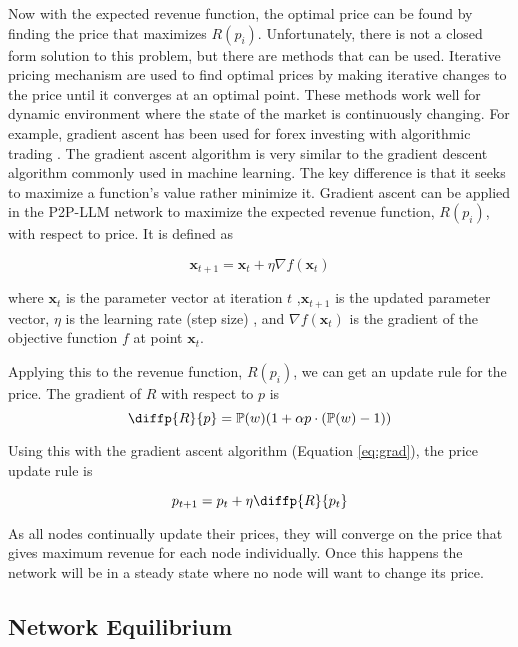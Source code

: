 \documentclass[preprint,twoside,11pt]{article}
\begin{document}
Now with the expected revenue function, the optimal price can be found by finding the price that maximizes $R(p_i)$.
Unfortunately, there is not a closed form solution to this problem, but there are methods that can be used.
Iterative pricing mechanism \citep{ecf80b8b-07bb-374f-ab3f-2cc6a349f689} are used to find optimal prices by making iterative changes to the price until it converges at an optimal point.
These methods work well for dynamic environment where the state of the market is continuously changing.
For example, gradient ascent has been used for forex investing with algorithmic trading \citep{su142215328}.
The gradient ascent algorithm is very similar to the gradient descent algorithm \citep{cauchy1847methode} commonly used in machine learning.
The key difference is that it seeks to maximize a function's value rather minimize it.
Gradient ascent can be applied in the P2P-LLM network to maximize the expected revenue function, $R(p_i)$, with respect to price.
It is defined as

\begin{equation}
	\mathbf{x}_{t+1} = \mathbf{x}_t + \eta \nabla f(\mathbf{x}_t)
	\label{eq:grad}
\end{equation}

where $\mathbf{x}_t$ is the parameter vector at iteration $t$
,$\mathbf{x}_{t+1}$ is the updated parameter vector,
$\eta$ is the learning rate (step size)
, and $\nabla f(\mathbf{x}_t)$ is the gradient of the objective function $f$ at point $\mathbf{x}_t$.

Applying this to the revenue function, $R(p_i)$, we can get an update rule for the price.
The gradient of $R$ with respect to $p$ is
$$\diffp{R}{p} = \mathbb{P}(w)(1 + \alpha p \cdot (\mathbb{P}(w) - 1))$$

Using this with the gradient ascent algorithm (Equation \ref{eq:grad}), the price update rule is

\begin{equation}
	p_{t+1} = p_t + \eta \diffp{R}{{p_t}}
	\label{eq:optim_price}
\end{equation}

As all nodes continually update their prices, they will converge on the price that gives
maximum revenue for each node individually. Once this happens the network will be in a steady state where
no node will want to change its price.

\subsection{Network Equilibrium}
\end{document}
